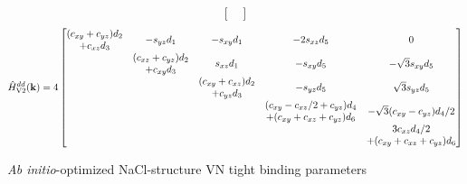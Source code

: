 \documentclass[twocolumn,showpacs,preprintnumbers,superscriptaddress,prb,floatfix,aps,10pt]{revtex4-1}
\renewcommand{\vec}[1]{\ensuremath{\mathbf{#1}}}
\newcommand*{\ham}{\hat{H}}
\begin{document}
\begin{widetext}
\begin{equation}
\begin{bmatrix}
\end{bmatrix}
\end{equation}
%
\begin{equation}
\ham_{\textrm{V2}}^{dd}(\vec{k})=4
\begin{bmatrix}
(c_{xy}+c_{yz})d_{2} & \multirow{2}{*}{$-s_{yz}d_{1}$} & \multirow{2}{*}{$-s_{xy}d_{1}$} & \multirow{2}{*}{$-2s_{xz}d_{5}$} & \multirow{2}{*}{$0$}\\
+c_{xz}d_{3}         &                                 &                                 &                                  & \\
\multirow{2}{*}{ }   & (c_{xz}+c_{yz})d_{2}            & \multirow{2}{*}{$s_{xz}d_{1}$}  & \multirow{2}{*}{$-s_{xy}d_{5}$}  & \multirow{2}{*}{$-\sqrt{3}s_{xy}d_{5}$}\\
                     & +c_{xy}d_{3}                    &                                 &                                  & \\
\multirow{2}{*}{ }   & \multirow{2}{*}{ }              & (c_{xy}+c_{xz})d_{2}            & \multirow{2}{*}{$-s_{yz}d_{5}$}  & \multirow{2}{*}{$\sqrt{3}s_{yz}d_{5}$}\\
                     &                                 & +c_{yz}d_{3}                    &                                  & \\
\multirow{2}{*}{ }   & \multirow{2}{*}{ }              & \multirow{2}{*}{ }              & (c_{xy}-c_{xz}/2+c_{yz})d_{4}    & \multirow{2}{*}{$-\sqrt{3}(c_{xy}-c_{yz})d_{4}/2$}\\
                     &                                 &                                 & +(c_{xy}+c_{xz}+c_{yz})d_{6}     & \\
\multirow{2}{*}{ }   & \multirow{2}{*}{ }              & \multirow{2}{*}{ }              & \multirow{2}{*}{ }               & 3c_{xz}d_{4}/2\\
                     &                                 &                                 &                                  & +(c_{xy}+c_{xz}+c_{yz})d_{6}\\
\end{bmatrix}
\end{equation}
%
\begin{table}[h]
\caption{\label{table:tbparameters} \emph{Ab initio}-optimized NaCl-structure VN tight binding parameters}
\setlength{\tabcolsep}{0.7em} %
{\renewcommand{\arraystretch}{1.5}%
}
\end{table}
\end{widetext}
\end{document}
